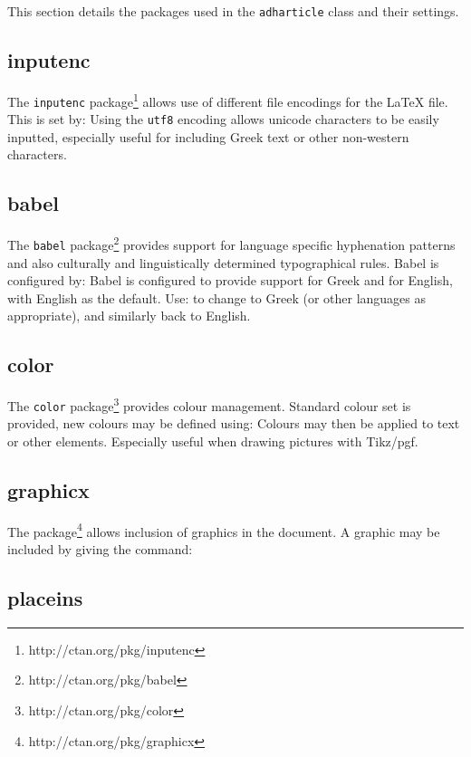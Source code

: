 \documentclass{adharticle}  %
\begin{document}
This section details the packages used in the \texttt{adharticle} class and
their settings.

\subsection{inputenc}

The \texttt{inputenc} package\footnote{http://ctan.org/pkg/inputenc} allows use
of different file encodings for the LaTeX file. This is set by:
Using the \texttt{utf8} encoding allows unicode characters to be easily
inputted, especially useful for including Greek text or other non-western
characters.

\subsection{babel}

The \texttt{babel} package\footnote{http://ctan.org/pkg/babel} provides support
for language specific hyphenation patterns and also culturally and
linguistically determined typographical rules. Babel is configured by:
Babel is configured to provide support for Greek and for English, with English
as the default. Use:
to change to Greek (or other  languages as appropriate), and similarly back to
English.

\subsection{color}

The \texttt{color} package\footnote{http://ctan.org/pkg/color} provides colour
management. Standard colour set is provided, new colours may be defined using:
Colours may then be applied to text or other elements. Especially useful when
drawing pictures with Tikz/pgf.

\subsection{graphicx}

The  package\footnote{http://ctan.org/pkg/graphicx} allows
inclusion of graphics in the document. A graphic may be included by giving the
command:

\subsection{placeins}
\end{document}
